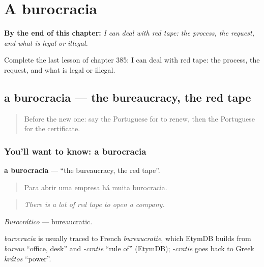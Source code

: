 
\chapter{A burocracia}
\label{ch:pt-a-burocracia}

\begin{chapteropening}
\textbf{By the end of this chapter:} \emph{I can deal with red tape: the process, the request, and what is legal or illegal.}

Complete the last lesson of chapter 385: I can deal with red tape: the process, the request, and what is legal or illegal.
\end{chapteropening}

\section[a burocracia]{a burocracia — the bureaucracy, the red tape}

\label{lesson:PT-C385-burocracia}



\begin{quote}
Before the new one: say the Portuguese for to renew, then the Portuguese for the certificate.
\end{quote}

\subsection*{You'll want to know: a burocracia}
\textbf{a burocracia} — \textquotedblleft{}the bureaucracy, the red tape\textquotedblright{}.

\begin{quote}
Para abrir uma empresa há muita burocracia.
\end{quote}

\begin{quote}
\emph{There is a lot of red tape to open a company.}
\end{quote}

\emph{Burocrático} — bureaucratic.

\begin{cousinweb}
\emph{burocracia} is usually traced to French \emph{bureaucratie}, which EtymDB builds from \emph{bureau} \textquotedblleft{}office, desk\textquotedblright{} and \emph{-cratie} \textquotedblleft{}rule of\textquotedblright{} (EtymDB); \emph{-cratie} goes back to Greek \emph{krátos} \textquotedblleft{}power\textquotedblright{}.
\end{cousinweb}

